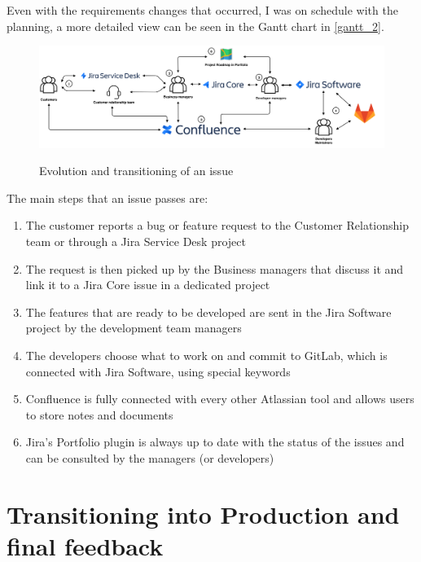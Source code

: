 	Even with the requirements changes that occurred, I was on schedule with the planning, a more detailed view can be seen in the Gantt chart in \ref{gantt_2}.
	\newpage
	\begin{landscape}
		\vspace*{\fill}
		\begin{figure}[H]
			\centering
			\includegraphics[width=22cm]{resources/UntitledDiagrammmmm}\\
			\caption{Evolution and transitioning of an issue}
		\end{figure}
		The main steps that an issue passes are:
		\begin{enumerate}
			\item The customer reports a bug or feature request to the Customer Relationship team or through a Jira Service Desk project
			\item The request is then picked up by the Business managers that discuss it and link it to a Jira Core issue in a dedicated project
			\item The features that are ready to be developed are sent in the Jira Software project by the development team managers
			\item The developers choose what to work on and commit to GitLab, which is connected with Jira Software, using special keywords
			\item Confluence is fully connected with every other Atlassian tool and allows users to store notes and documents
			\item Jira's Portfolio plugin is always up to date with the status of the issues and can be consulted by the managers (or developers)
		\end{enumerate}
		\hfill
		\vspace*{\fill}
	\end{landscape}
	\newpage

\section{Transitioning into Production and final feedback}


